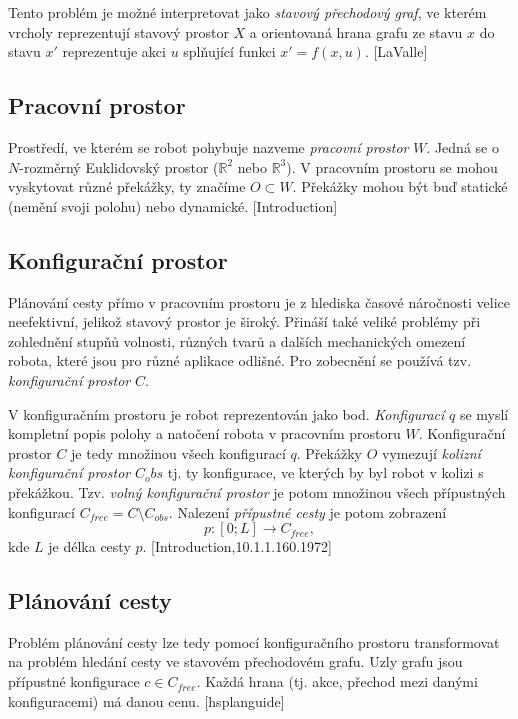 Tento problém je možné interpretovat jako \emph{stavový přechodový graf}, ve kterém vrcholy reprezentují stavový prostor $X$ a orientovaná hrana grafu ze stavu $x$ do stavu $x'$ reprezentuje akci $u$ splňující funkci $x'=f(x,u)$. [LaValle]

\subsection{Pracovní prostor}
Prostředí, ve kterém se robot pohybuje nazveme \emph{pracovní prostor} $W$. Jedná se o $N$-rozměrný Euklidovský prostor ($\mathbb{R}^2$ nebo $\mathbb{R}^3$). V pracovním prostoru se mohou vyskytovat různé překážky, ty značíme $O\subset W$. Překážky mohou být buď statické (nemění svoji polohu) nebo dynamické. [Introduction]


\subsection{Konfigurační prostor}
Plánování cesty přímo v pracovním prostoru je z hlediska časové náročnosti velice neefektivní, jelikož stavový prostor je široký. Přináší také veliké problémy při zohlednění stupňů volnosti, různých tvarů a dalších mechanických omezení robota, které jsou pro různé aplikace odlišné. Pro zobecnění se používá tzv. \emph{konfigurační prostor} $C$.

V konfiguračním prostoru je robot reprezentován jako bod. \emph{Konfigurací} $q$ se myslí kompletní popis polohy a natočení robota v pracovním prostoru $W$. Konfigurační prostor $C$ je tedy množinou všech konfigurací $q$. Překážky $O$ vymezují \emph{kolizní konfigurační prostor} $C_obs$ tj. ty konfigurace, ve kterých by byl robot v kolizi s překážkou. Tzv. \emph{volný konfigurační prostor} je potom množinou všech přípustných konfigurací $C_{free}=C \setminus C_{obs}$. Nalezení \emph{přípustné cesty} je potom zobrazení
\begin{equation}
p: \left[0;L\right]\to C_{free},
\end{equation}
kde $L$ je délka cesty $p$. [Introduction,10.1.1.160.1972]

\subsection{Plánování cesty}

Problém plánování cesty lze tedy pomocí konfiguračního prostoru transformovat na problém hledání cesty ve stavovém přechodovém grafu. Uzly grafu jsou přípustné konfigurace $c\in C_{free}$. Každá hrana (tj. akce, přechod mezi danými konfiguracemi) má danou cenu. [hsplanguide]

